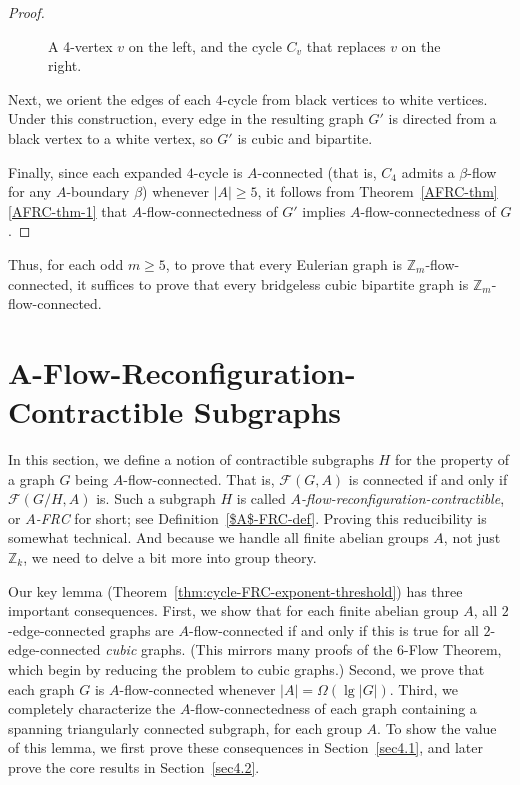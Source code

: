 \documentclass[a4paper,12pt]{article}
\theoremstyle{plain}
\theoremstyle{definition}
\newcommand{\Z}{\mathbb{Z}}
\newcommand\F{\mathcal{F}}
\renewcommand\ge\geqslant
\begin{document}
\begin{proof}
\begin{figure}[!h]
	\captionsetup{width=.45\textwidth}
	\caption{A 4-vertex $v$ on the left, and the cycle $C_v$ that replaces $v$ on the right.}
\end{figure}


Next, we orient the edges of each $4$-cycle from black vertices to white vertices. Under this construction, every edge in the resulting graph $G'$ is directed from a black vertex to a white vertex, so $G'$ is cubic and bipartite.

Finally, since each expanded $4$-cycle is $A$-connected (that is, $C_4$ admits a $\beta$-flow for any $A$-boundary $\beta$) whenever $|A|\ge 5$, it follows from Theorem~\ref{AFRC-thm}\ref{AFRC-thm-1} that $A$-flow-connectedness of $G'$ implies $A$-flow-connectedness of $G$.
\end{proof}



Thus, for each odd $m\ge 5$, to prove that every Eulerian graph is $\mathbb{Z}_m$-flow-connected, it suffices to prove that every bridgeless cubic bipartite graph is $\mathbb{Z}_m$-flow-connected.


\section{\texorpdfstring{$\bm{A}$}{A}-Flow-Reconfiguration-Contractible Subgraphs}
\label{AFRC-sec}
In this section, we define a notion of contractible subgraphs $H$ for the property of a graph $G$ being $A$-flow-connected.
That is, $\F(G,A)$ is connected if and only if $\F(G/H,A)$ is.
Such a subgraph $H$ is called
\emph{$A$-flow-reconfiguration-contractible}, or \emph{$A$-FRC} for short; see Definition~\ref{$A$-FRC-def}.
Proving this reducibility is somewhat technical.  And because we handle all finite abelian groups $A$, not just $\Z_k$, we need to delve a bit more into group theory.

Our key lemma (Theorem~\ref{thm:cycle-FRC-exponent-threshold}) has three important consequences. First, we show that for each finite abelian group $A$, all $2$-edge-connected graphs are $A$-flow-connected if and only if this is true for all $2$-edge-connected \emph{cubic} graphs. (This mirrors many proofs of the $6$-Flow Theorem, which begin by reducing the problem to cubic graphs.) Second, we prove that each graph $G$ is $A$-flow-connected whenever $|A|=\Omega(\lg |G|)$. 
Third, we completely characterize the $A$-flow-connectedness of each graph containing a spanning triangularly connected subgraph, for each group $A$. To show the value of this lemma, we first prove these consequences in Section~\ref{sec4.1}, and later prove the core results in Section~\ref{sec4.2}.
\end{document}
